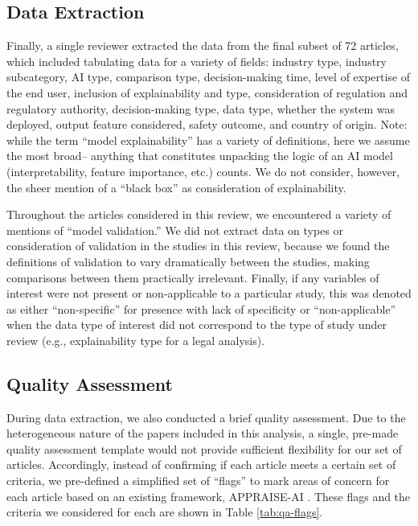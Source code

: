 \documentclass[authoryear,preprint,12pt]{elsarticle}
\begin{document}
\subsection{Data Extraction}
Finally, a single reviewer extracted the data from the final subset of 72 articles, which
included tabulating data for a variety of fields: industry type, industry
subcategory, AI type, comparison type, decision-making time, level of expertise
of the end user, inclusion of explainability and type, consideration of
regulation and regulatory authority, decision-making type, data type, whether
the system was deployed, output feature considered, safety outcome, and country
of origin. Note: while the term ``model explainability'' has a variety of
definitions, here we assume the most broad-- anything that constitutes unpacking
the logic of an AI model (interpretability, feature importance, etc.) counts. We
do not consider, however, the sheer mention of a ``black box'' as consideration
of explainability. 

Throughout the articles considered in this review, we
encountered a variety of mentions of ``model validation.'' We did not extract
data on types or consideration of validation in the studies in this review,
because we found the definitions of validation to vary dramatically between the
studies, making comparisons between them practically irrelevant. Finally, if any variables of interest were not present or non-applicable to a particular study, this was denoted as either ``non-specific'' for presence with lack of specificity or ``non-applicable'' when the data type of interest did not correspond to the type of study under review (e.g., explainability type for a legal analysis).

\subsection{Quality Assessment}
\label{sec:QA}
During data extraction, we also conducted a brief quality assessment. Due to the
heterogeneous nature of the papers included in this analysis, a single, pre-made
quality assessment template would not provide sufficient flexibility for our set
of articles. Accordingly, instead of confirming if each article meets a certain
set of criteria, we pre-defined a simplified set of ``flags'' to mark areas of
concern for each article based on an existing framework, APPRAISE-AI
\cite{kwongAPPRAISEAIToolQuantitative2023}. These flags and the criteria we
considered for each are shown in Table \ref{tab:qa-flags}.
\end{document}
